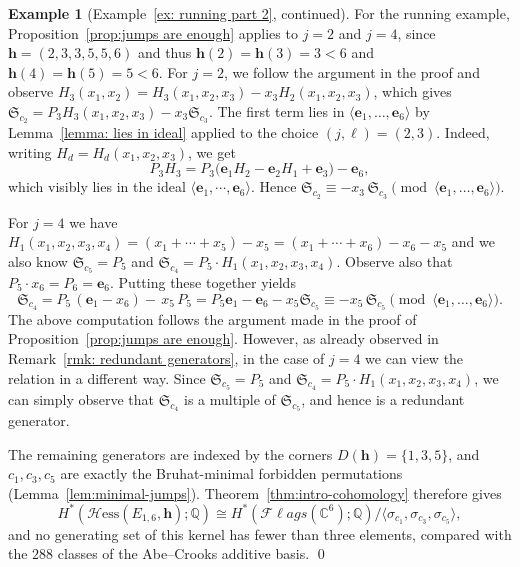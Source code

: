 \documentclass[11pt]{amsart}
\theoremstyle{plain}
\theoremstyle{definition}
\newtheorem{ex}[thm]{Example}
\newcommand{\Hess}{\mathcal{H}\mathrm{ess}}
\newcommand{\hess}{{\mathbf h}}
\newcommand{\Fl}{\mathcal{F}\ell ags}
\newcommand{\C}{\mathbb{C}}           %
\newcommand{\Q}{\mathbb{ Q}}           %
\newcommand{\exampleqed}{%
    {   
    \renewcommand{\qedsymbol}{$\lozenge$}%
    \qed%
    }
}
\numberwithin{equation}{section}
\begin{document}
\begin{ex}[Example~\ref{ex: running part 2}, continued]\label{ex: running B}
For the running example, Proposition~\ref{prop:jumps are enough} applies to $j=2$ and $j=4$, since $\hess=(2,3,3,5,5,6)$ and thus $\hess(2)=\hess(3)=3<6$ and $\hess(4)=\hess(5)=5<6$. For $j=2$, we follow the argument in the proof and observe 
$H_3(x_1,x_2)=H_3(x_1,x_2,x_3)-x_3H_2(x_1,x_2,x_3)$, which gives $\mathfrak{S}_{c_2}=P_3H_3(x_1,x_2,x_3)-x_3\mathfrak{S}_{c_3}$. The first term lies in $\langle\mathbf{e}_1,\ldots,\mathbf{e}_6\rangle$ by Lemma~\ref{lemma: lies in ideal} applied to the choice $(j,\ell)=(2,3)$. Indeed, writing $H_d=H_d(x_1,x_2,x_3)$, we get
\[
P_3H_3=P_3\bigl(\mathbf{e}_1H_2-\mathbf{e}_2H_1+\mathbf{e}_3\bigr)-\mathbf{e}_6,
\]
which visibly lies in the ideal $\langle \mathbf{e}_1,\cdots,\mathbf{e}_6\rangle$. 
Hence $\mathfrak{S}_{c_2}\equiv -x_3\,\mathfrak{S}_{c_3}\pmod{\langle\mathbf{e}_1,\ldots,\mathbf{e}_6\rangle}$.

For $j=4$ we have $H_1(x_1,x_2,x_3,x_4)=(x_1+\cdots+x_5)-x_5 = (x_1+\cdots+x_6)-x_6 - x_5$ and we also know $\mathfrak{S}_{c_5}=P_5$ and $\mathfrak{S}_{c_4}=P_5 \cdot H_1(x_1,x_2,x_3,x_4)$. Observe also that $P_5 \cdot x_6 = P_6 = \mathbf{e}_6$. Putting these together yields
\[
\mathfrak{S}_{c_4}
=P_5\,(\mathbf{e}_1 - x_6)-\,x_5\,P_5
 = P_5 \mathbf{e}_1 - \mathbf{e}_6 - x_5 \mathfrak{S}_{c_5} \equiv -x_5\,\mathfrak{S}_{c_5}\pmod{\langle\mathbf{e}_1,\ldots,\mathbf{e}_6\rangle}.
\]
The above computation follows the argument made in the proof of Proposition~\ref{prop:jumps are enough}. However, as already observed in Remark~\ref{rmk: redundant generators}, 
in the case of $j=4$ we can view the relation in a different way. Since $\mathfrak{S}_{c_5}=P_5$ and $\mathfrak{S}_{c_4}=P_5 \cdot H_1(x_1,x_2,x_3,x_4)$, we can simply observe that $\mathfrak{S}_{c_4}$ is a multiple of $\mathfrak{S}_{c_5}$, and hence is a redundant generator.  


The remaining generators are indexed by the corners $D(\hess)=\{1,3,5\}$, and $c_1,c_3,c_5$ are exactly the Bruhat-minimal forbidden permutations (Lemma~\ref{lem:minimal-jumps}). Theorem~\ref{thm:intro-cohomology} therefore gives
\[
H^*(\Hess(E_{1,6},\hess);\Q)\cong H^*(\Fl(\C^6);\Q)\big/\langle\sigma_{c_1},\sigma_{c_3},\sigma_{c_5}\rangle,
\]
and no generating set of this kernel has fewer than three elements, compared with the $288$ classes of the Abe--Crooks additive basis.
\exampleqed
\end{ex}
\end{document}
